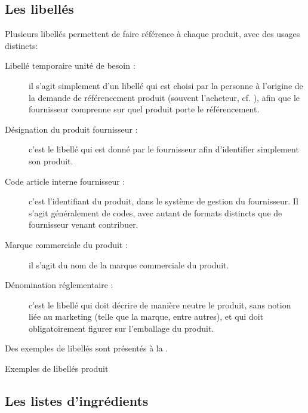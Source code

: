             \subsection{Les libellés}

            Plusieurs libellés permettent de faire référence à chaque produit, avec des usages distincts:
            \begin{description}
                \item[Libellé temporaire unité de besoin :] il s'agit simplement d'un libellé qui est choisi par la personne à l'origine de la demande de référencement produit (souvent l'acheteur, cf. ), afin que le fournisseur comprenne sur quel produit porte le référencement.
                \item[Désignation du produit fournisseur :] c'est le libellé qui est donné par le fournisseur afin d'identifier simplement son produit.
                \item[Code article interne fournisseur :] c'est l'identifiant du produit, dans le système de gestion du fournisseur. Il s'agit généralement de codes, avec autant de formats distincts que de fournisseur venant contribuer.
                \item[Marque commerciale du produit :] il s'agit du nom de la marque commerciale du produit. 
                \item[Dénomination réglementaire :] c'est le libellé qui doit décrire de manière neutre le produit, sans notion liée au marketing (telle que la marque, entre autres), et qui doit obligatoirement figurer sur l'emballage du produit.
                \end{description}

            Des exemples de libellés sont présentés à la .

            {\renewcommand{\arraystretch}{2}%
            \begin{table}[htbp]
                {\scriptsize
                \begin{center}%
                \caption{Exemples de libellés produit}%
                \label{tbl:exemple_lib}%
                \end{center}%
                }
            \end{table}
            }

            \subsection{Les listes d'ingrédients}
            \label{listes_ingredients}

